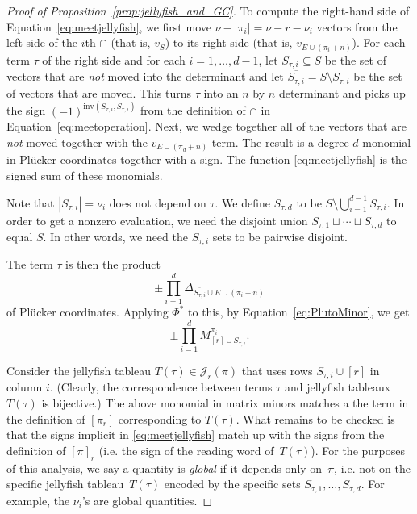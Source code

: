 \documentclass[10pt]{amsart}
\theoremstyle{definition}
\theoremstyle{plain}
\theoremstyle{plain}
\theoremstyle{definition}
\theoremstyle{remark}
\theoremstyle{plain}
\theoremstyle{plain}
\theoremstyle{plain}
\numberwithin{equation}{section}
\newcommand{\inv}{\mathrm{inv}}
\begin{document}
\begin{proof}[Proof of Proposition~\ref{prop:jellyfish_and_GC}]
To compute the right-hand side of Equation~\eqref{eq:meetjellyfish}, we first move $\nu - |\pi_i| = \nu - r - \nu_i$ vectors from the left side of the $i$th $\cap$ (that is, $v_S$) to its right side (that is, $v_{E \cup (\pi_i + n)}$). For each term $\tau$ of the right side and for each $i=1,\dots,d-1$, let $S_{\tau,i} \subseteq S$ be the set of vectors that are \emph{not} moved into the determinant and let $\overline{S_{\tau,i}} = S \setminus S_{\tau,i}$ be the set of vectors that are moved. This turns $\tau$ into an $n$ by $n$ determinant and picks up the sign $(-1)^{\inv(\overline{S_{\tau,i}}, S_{\tau,i})}$ from the definition of $\cap$ in Equation~\eqref{eq:meetoperation}.
Next, we wedge together all of the vectors that are {\sl not} moved together with the $v_{E \cup (\pi_d+n)}$ term. The result is a degree $d$ monomial in Pl\"ucker coordinates together with a sign. The function \eqref{eq:meetjellyfish} is the signed sum of these monomials. 

Note that $|S_{\tau,i}| = \nu_i$ does not depend on $\tau$. We define $S_{\tau,d}$ to be $S \setminus \bigcup_{i=1}^{d-1}S_{\tau,i}$. In order to get a nonzero evaluation, we need the disjoint union $S_{\tau,1} \sqcup \cdots \sqcup S_{\tau, d}$ to  equal  $S$. In other words, we need the $S_{\tau,i}$ sets to be pairwise disjoint.

The term $\tau$ is then the product 
\begin{equation}
\pm \prod_{i=1}^d\Delta_{\overline{S_{\tau,i}} \cup E \cup (\pi_i+n)}
\end{equation}
of Pl\"ucker coordinates.
Applying $\Phi^*$ to this, by Equation~\eqref{eq:PlutoMinor}, we get 
\begin{equation}
\pm \prod_{i=1}^d M^{\pi_i}_{[r] \cup S_{\tau,i}}.
\end{equation}

Consider the jellyfish tableau $T(\tau) \in \mathcal{J}_r(\pi)$ that uses rows $S_{\tau,i} \cup [r]$ in column $i$. (Clearly, the correspondence between terms $\tau$ and jellyfish tableaux $T(\tau)$ is bijective.) The above monomial in matrix minors matches a the term in the definition of $[\pi_r]$ corresponding to $T(\tau)$. What remains to be checked is that the signs implicit in \eqref{eq:meetjellyfish} match up with the signs from the definition of $[\pi]_r$ (i.e. the sign of the reading word of~$T(\tau)$). For the purposes of this analysis, we say a quantity is \emph{global} if it depends only on~$\pi$, i.e. not on the specific jellyfish tableau~$T(\tau)$ encoded by the specific sets $S_{\tau,1},\dots,S_{\tau,d}$. For example, the $\nu_i$'s are global quantities. 


\end{proof}
\end{document}
